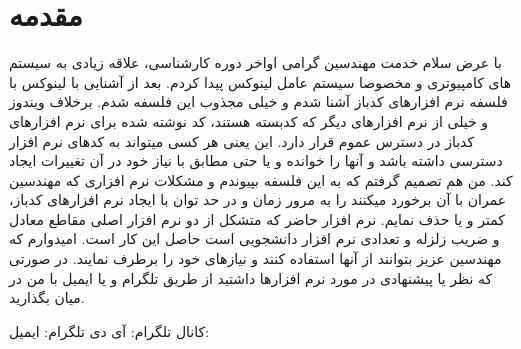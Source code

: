 \section*{مقدمه}

با عرض سلام خدمت مهندسین گرامی \newline
اواخر دوره کارشناسی، علاقه زیادی به سیستم های کامپیوتری و مخصوصا سیستم عامل لینوکس پیدا کردم. بعد از آشنایی با لینوکس با فلسفه نرم افزارهای کدباز آشنا شدم و خیلی مجذوب این فلسفه شدم.
برخلاف ویندوز و خیلی از نرم افزارهای دیگر که کدبسته هستند، کد نوشته شده برای نرم افزارهای کدباز در دسترس عموم قرار دارد. این یعنی هر کسی میتواند به کدهای نرم افزار دسترسی داشته باشد و آنها را خوانده و یا حتی مطابق با نیاز خود در آن تغییرات ایجاد کند. 
من هم تصمیم گرفتم که به این فلسفه بپیوندم و مشکلات نرم افزاری که مهندسین عمران با آن برخورد میکنند را به مرور زمان و در حد توان با ایجاد نرم افزارهای کدباز، کمتر و یا حذف نمایم. نرم افزار حاضر که متشکل از دو نرم افزار اصلی مقاطع معادل و ضریب زلزله و تعدادی نرم افزار دانشجویی است
حاصل این کار است. امیدوارم که مهندسین عزیز بتوانند از آنها استفاده کنند و نیازهای خود را برطرف نمایند.
در صورتی که نظر یا پیشنهادی در مورد نرم افزارها داشتید از طریق تلگرام و یا ایمیل با من در میان بگذارید.



کانال تلگرام:  \newline
آی دی تلگرام:  \newline
ایمیل: 

\newpage